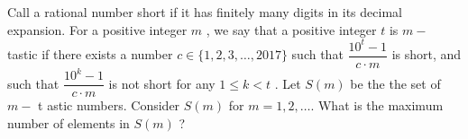 Call a rational number 
short
 if it has finitely many digits in its decimal expansion. For a positive integer 
$m$
,
 we say that a positive integer 
$t$
 is 
$m-$
tastic
 if there exists a number 
$c\in \{1,2,3,\ldots ,2017\}$
 such that 
$\dfrac{10^t-1}{c\cdot m}$
 is short, and such that 
$\dfrac{10^k-1}{c\cdot m}$
 is not short for any 
$1\le k < t$
.
 Let 
$S(m)$
 be the the set of 
$m-$
t
astic numbers. Consider 
$S(m)$
 for 
$m=1,2,\ldots{}.$
 What is the maximum number of elements in 
$S(m)$
?
